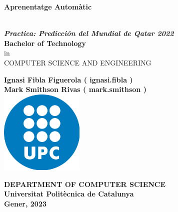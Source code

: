 \thispagestyle{empty}
\begin{center}
    \begin{LARGE}			\bf{Aprenentatge Automàtic\\}
    \end{LARGE}
    \vspace*{25pt}
    
    \textbf{\\
        \it{Practica: Predicción del Mundial de Qatar 2022}\\}
        \vspace{20pt}
    \textbf{Bachelor of Technology\\}
    in\\
    \vspace{3pt}
    {COMPUTER SCIENCE AND ENGINEERING}\\
    \vspace{40pt}
    
    \textbf{
        Ignasi Fibla Figuerola ( ignasi.fibla )\\
        Mark Smithson Rivas ( mark.smithson )}\\
    \vspace{30pt}
    \includegraphics[width=0.3\textwidth]{images/logoUPC.png} \\
    \vspace{160pt}
    
    \textbf{DEPARTMENT OF COMPUTER SCIENCE\\
        Universitat Politècnica de Catalunya\\
        Gener, 2023
    }
\end{center}

\newpage